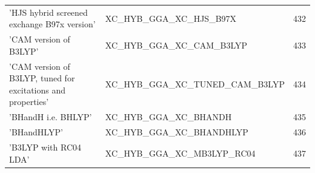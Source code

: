 \documentclass[final,12pt]{article}
\begin{document}
{{{{{{\begin{table}[!h]
\begin{center}
\begin{tabular}{llr}
  'HJS hybrid screened exchange B97x version' & XC\_HYB\_GGA\_XC\_HJS\_B97X  &432\\
  'CAM version of B3LYP' & XC\_HYB\_GGA\_XC\_CAM\_B3LYP  &433\\
  'CAM version of B3LYP, tuned for excitations and properties' & XC\_HYB\_GGA\_XC\_TUNED\_CAM\_B3LYP  &434\\
  'BHandH i.e. BHLYP' & XC\_HYB\_GGA\_XC\_BHANDH  &435\\
  'BHandHLYP' & XC\_HYB\_GGA\_XC\_BHANDHLYP  &436\\
  'B3LYP with RC04 LDA' & XC\_HYB\_GGA\_XC\_MB3LYP\_RC04  &437\\
\end{tabular}
\end{center}
\end{table}

}}}}}}
\end{document}
